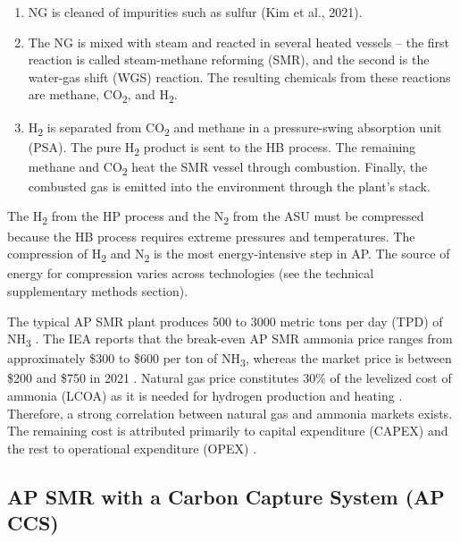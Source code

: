 \documentclass{article}
\begin{document}
\begin{enumerate}
    \item NG is cleaned of impurities such as sulfur (Kim et al., 2021).
    \item The NG is mixed with steam and reacted in several heated vessels – the first reaction is called steam-methane reforming (SMR), and the second is the water-gas shift (WGS) reaction. The resulting chemicals from these reactions are methane, CO\textsubscript{2}, and H\textsubscript{2}.
    \item H\textsubscript{2} is separated from CO\textsubscript{2} and methane in a pressure-swing absorption unit (PSA). The pure H\textsubscript{2} product is sent to the HB process. The remaining methane and CO\textsubscript{2} heat the SMR vessel through combustion. Finally, the combusted gas is emitted into the environment through the plant’s stack.
\end{enumerate}

The H\textsubscript{2} from the HP process and the N\textsubscript{2} from the ASU must be compressed because the HB process requires extreme pressures and temperatures. The compression of H\textsubscript{2} and N\textsubscript{2} is the most energy-intensive step in AP. The source of energy for compression varies across technologies (see the technical supplementary methods section).

The typical AP SMR plant produces 500 to 3000 metric tons per day (TPD) of NH\textsubscript{3} \cite{Amhamed2022, IEA2021}. The IEA reports that the break-even AP SMR ammonia price ranges from approximately \$300 to \$600 per ton of NH\textsubscript{3}, whereas the market price is between \$200 and \$750 in 2021 \cite{IEA2021}. Natural gas price constitutes 30\% of the levelized cost of ammonia (LCOA) as it is needed for hydrogen production and heating \cite{Appl1999, Maxwell2012, Zhang2020}. Therefore, a strong correlation between natural gas and ammonia markets exists. The remaining cost is attributed primarily to capital expenditure (CAPEX) and the rest to operational expenditure (OPEX) \cite{Appl1999, Maxwell2012}.

\subsection{AP SMR with a Carbon Capture System (AP CCS)}
\end{document}
